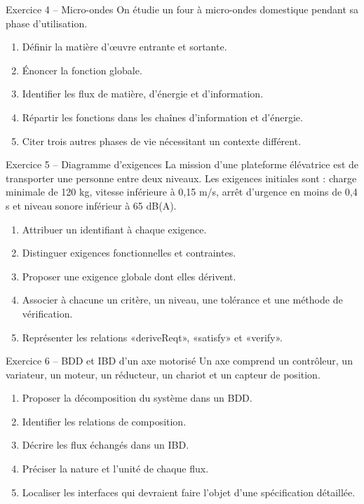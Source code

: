 \begin{TLExercise}{Exercice 4 -- Micro-ondes}
On étudie un four à micro-ondes domestique pendant sa phase d'utilisation.
\begin{enumerate}
  \item Définir la matière d'œuvre entrante et sortante.
  \item Énoncer la fonction globale.
  \item Identifier les flux de matière, d'énergie et d'information.
  \item Répartir les fonctions dans les chaînes d'information et d'énergie.
  \item Citer trois autres phases de vie nécessitant un contexte différent.
\end{enumerate}
\end{TLExercise}

\begin{TLExercise}{Exercice 5 -- Diagramme d'exigences}
La mission d'une plateforme élévatrice est de transporter une personne entre deux niveaux. Les exigences initiales sont : charge minimale de 120 kg, vitesse inférieure à 0,15 m/s, arrêt d'urgence en moins de 0,4 s et niveau sonore inférieur à 65 dB(A).
\begin{enumerate}
  \item Attribuer un identifiant à chaque exigence.
  \item Distinguer exigences fonctionnelles et contraintes.
  \item Proposer une exigence globale dont elles dérivent.
  \item Associer à chacune un critère, un niveau, une tolérance et une méthode de vérification.
  \item Représenter les relations «deriveReqt», «satisfy» et «verify».
\end{enumerate}
\end{TLExercise}

\begin{TLExercise}{Exercice 6 -- BDD et IBD d'un axe motorisé}
Un axe comprend un contrôleur, un variateur, un moteur, un réducteur, un chariot et un capteur de position.
\begin{enumerate}
  \item Proposer la décomposition du système dans un BDD.
  \item Identifier les relations de composition.
  \item Décrire les flux échangés dans un IBD.
  \item Préciser la nature et l'unité de chaque flux.
  \item Localiser les interfaces qui devraient faire l'objet d'une spécification détaillée.
\end{enumerate}
\end{TLExercise}

